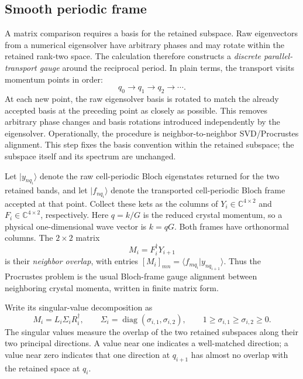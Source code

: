 \documentclass[11pt]{article}
\newcommand{\C}{\mathbb{C}}
\begin{document}
\subsection{Smooth periodic frame}

A matrix comparison requires a basis for the retained subspace. Raw eigenvectors from a
numerical eigensolver have arbitrary phases and may rotate within the retained rank-two
space. The calculation therefore constructs a \emph{discrete parallel-transport gauge}
around the reciprocal period. In plain terms, the transport visits momentum points in
order:
\[
 q_0\longrightarrow q_1\longrightarrow q_2\longrightarrow\cdots.
\]
At each new point, the raw eigensolver basis is rotated to match the already accepted
basis at the preceding point as closely as possible. This removes arbitrary phase
changes and basis rotations introduced independently by the eigensolver. Operationally,
the procedure is neighbor-to-neighbor SVD/Procrustes alignment. This step fixes the
basis convention within the retained subspace; the subspace itself and its spectrum are
unchanged.

Let $|y_{nq_i}\rangle$ denote the raw cell-periodic Bloch eigenstates returned for the
two retained bands, and let $|f_{nq_i}\rangle$ denote the transported cell-periodic
Bloch frame accepted at that point. Collect these kets as the columns of
$Y_i\in\C^{4\times2}$ and $F_i\in\C^{4\times2}$, respectively. Here $q=k/G$ is the
reduced crystal momentum, so a physical one-dimensional wave vector is $k=qG$.
Both frames have orthonormal columns. The $2\times2$ matrix
\begin{equation}
 M_i=F_i^\dagger Y_{i+1}
 \label{eq:neighbor-overlap}
\end{equation}
is their \emph{neighbor overlap}, with entries
$[M_i]_{mn}=\langle f_{mq_i}|y_{nq_{i+1}}\rangle$. Thus the Procrustes problem is the
usual Bloch-frame gauge alignment between neighboring crystal momenta, written in finite
matrix form.

Write its singular-value decomposition as
\begin{equation}
 M_i=L_i\Sigma_iR_i^\dagger,
 \qquad
 \Sigma_i=\operatorname{diag}(\sigma_{i,1},\sigma_{i,2}),
 \qquad
 1\ge\sigma_{i,1}\ge\sigma_{i,2}\ge0.
 \label{eq:overlap-svd}
\end{equation}
The singular values measure the overlap of the two retained subspaces along their two
principal directions. A value near one indicates a well-matched direction; a value near
zero indicates that one direction at $q_{i+1}$ has almost no overlap with the retained
space at $q_i$.
\end{document}
